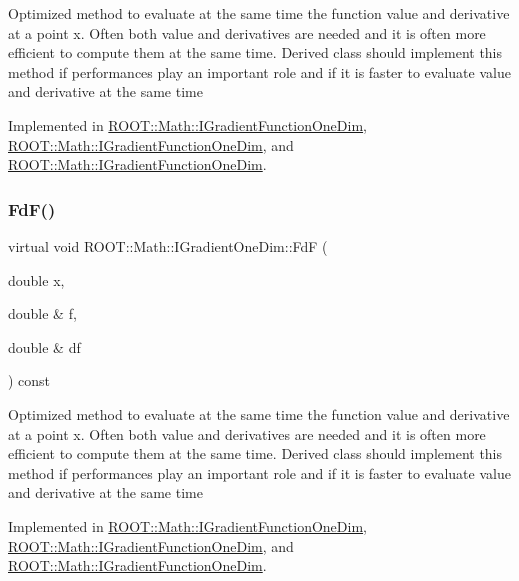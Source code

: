 Optimized method to evaluate at the same time the function value and derivative at a point x. Often both value and derivatives are needed and it is often more efficient to compute them at the same time. Derived class should implement this method if performances play an important role and if it is faster to evaluate value and derivative at the same time 

Implemented in \mbox{\hyperlink{classROOT_1_1Math_1_1IGradientFunctionOneDim_a01eaedb2ae1dfa5722f11281acf7a72b}{R\+O\+O\+T\+::\+Math\+::\+I\+Gradient\+Function\+One\+Dim}}, \mbox{\hyperlink{classROOT_1_1Math_1_1IGradientFunctionOneDim_a01eaedb2ae1dfa5722f11281acf7a72b}{R\+O\+O\+T\+::\+Math\+::\+I\+Gradient\+Function\+One\+Dim}}, and \mbox{\hyperlink{classROOT_1_1Math_1_1IGradientFunctionOneDim_a01eaedb2ae1dfa5722f11281acf7a72b}{R\+O\+O\+T\+::\+Math\+::\+I\+Gradient\+Function\+One\+Dim}}.

\mbox{\label{classROOT_1_1Math_1_1IGradientOneDim_aef5560ea7d43e64d94bf875713e2a5fc}} 
\subsubsection{\texorpdfstring{FdF()}{FdF()}\hspace{0.1cm}{\footnotesize\ttfamily [3/6]}}
{\footnotesize\ttfamily virtual void R\+O\+O\+T\+::\+Math\+::\+I\+Gradient\+One\+Dim\+::\+FdF (\begin{DoxyParamCaption}\item[{double}]{x,  }\item[{double \&}]{f,  }\item[{double \&}]{df }\end{DoxyParamCaption}) const\hspace{0.3cm}{\ttfamily [pure virtual]}}

Optimized method to evaluate at the same time the function value and derivative at a point x. Often both value and derivatives are needed and it is often more efficient to compute them at the same time. Derived class should implement this method if performances play an important role and if it is faster to evaluate value and derivative at the same time 

Implemented in \mbox{\hyperlink{classROOT_1_1Math_1_1IGradientFunctionOneDim_a01eaedb2ae1dfa5722f11281acf7a72b}{R\+O\+O\+T\+::\+Math\+::\+I\+Gradient\+Function\+One\+Dim}}, \mbox{\hyperlink{classROOT_1_1Math_1_1IGradientFunctionOneDim_a01eaedb2ae1dfa5722f11281acf7a72b}{R\+O\+O\+T\+::\+Math\+::\+I\+Gradient\+Function\+One\+Dim}}, and \mbox{\hyperlink{classROOT_1_1Math_1_1IGradientFunctionOneDim_a01eaedb2ae1dfa5722f11281acf7a72b}{R\+O\+O\+T\+::\+Math\+::\+I\+Gradient\+Function\+One\+Dim}}.

